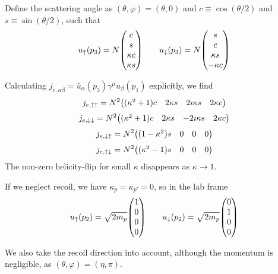 \documentclass[a4paper,twoside,master.tex]{subfiles}
\begin{document}
Define the scattering angle as $ (\theta, \varphi)= (\theta, 0) $ and $ c \equiv \cos(\theta / 2) $ and $ s \equiv \sin(\theta / 2) $, such that
\begin{equation}
    u_{\uparrow}(p_3) = N \mqty(c\\s\\ \kappa c\\ \kappa s) \qquad u_{\downarrow}(p_3) = N \mqty(s\\c\\ \kappa s\\ - \kappa c)
\end{equation}

Calculating $ j_{e, \alpha \beta} = \bar{u}_{\alpha}(p_3) \gamma^{\mu} u_{\beta}(p_1) $ explicitly, we find
\begin{equation}
    j_{e, \uparrow\uparrow} = N^2 \mqty( (\kappa^2 + 1)c & 2 \kappa s & 2 \imath \kappa s & 2 \kappa c)
\end{equation}
\begin{equation}
    j_{e, \downarrow\downarrow} = N^2 \mqty( (\kappa^2 + 1)c & 2 \kappa s & - 2 \imath \kappa s & 2 \kappa c)
\end{equation}
\begin{equation}
    j_{e, \downarrow\uparrow} = N^2 \mqty( (1 - \kappa^2) s & 0 & 0 & 0)
\end{equation}
\begin{equation}
    j_{e, \uparrow\downarrow} = N^2 \mqty( (\kappa^2 - 1)s & 0 & 0 & 0)
\end{equation}
The non-zero helicity-flip for small $ \kappa $ disappears as $ \kappa \to 1 $.

If we neglect recoil, we have $ \kappa_p = \kappa_{p'} = 0 $, so in the lab frame
\begin{equation}
    u_{\uparrow}(p_2) = \sqrt{2m_p} \mqty(1\\0\\0\\0) \qquad u_{\downarrow}(p_2) = \sqrt{2 m_p} \mqty(0\\1\\0\\0)
\end{equation}

We also take the recoil direction into account, although the momentum is negligible, as $ (\theta, \varphi) = (\eta, \pi) $. 
\end{document}
